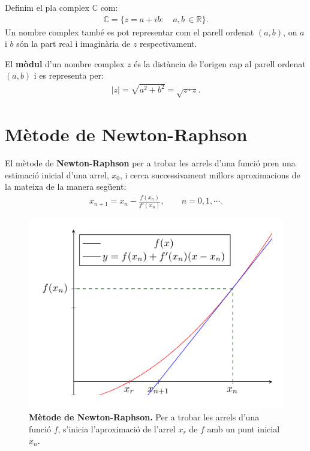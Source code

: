 \documentclass[12pt,a4paper]{report}
\begin{document}
Definim el pla complex $\mathbb{C}$ com:
\begin{align*}
\mathbb{C}=\{z=a+ib:\quad a,b\, \in\mathbb{R}\}.
\end{align*}
Un nombre complex també es pot representar com el parell ordenat $(a,b)$, on $a$ i $b$ són la part real i imaginària de $z$ respectivament.  

El \textbf{mòdul} d'un nombre complex $z$ és la distància de l'origen cap al parell ordenat $(a,b)$ i es representa per:
\begin{align*}
\vert z\vert=\sqrt{a^2 + b^2}=\sqrt{z\cdot z}.
\end{align*}
\section{Mètode de Newton-Raphson}
El mètode de \textbf{Newton-Raphson} per a trobar les arrels d'una funció pren una estimació inicial d'una arrel, $x_0$, i cerca successivament millors aproximacions de la mateixa de la manera següent:
\begin{align*}
x_{n+1}=x_{n}-\frac{f(x_{n})}{f'(x_{n})}, \qquad n=0,1,\cdots.
\end{align*}
\begin{figure}[!ht]
\centering
\includegraphics[scale=1]{img/img06_method_newthon.pdf}
\caption{\textbf{Mètode de Newton-Raphson.} Per a trobar les arrels d'una funció $f$, s'inicia l'aproximació de l'arrel $x_r$ de $f$ amb un punt inicial $x_n$.}
\label{img06_newton}
\end{figure}
\end{document}
